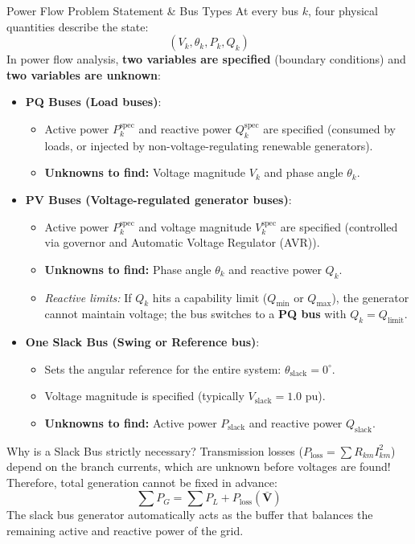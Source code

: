 \begin{frame}[allowframebreaks]{Power Flow Problem Statement \& Bus Types}
    At every bus $k$, four physical quantities describe the state:
    $$(V_k, \theta_k, P_k, Q_k)$$
    In power flow analysis, \textbf{two variables are specified} (boundary conditions) and \textbf{two variables are unknown}:
    
    \begin{itemize}
        \item \textbf{PQ Buses (Load buses)}:
        \begin{itemize}
            \item Active power $P_k^{\text{spec}}$ and reactive power $Q_k^{\text{spec}}$ are specified (consumed by loads, or injected by non-voltage-regulating renewable generators).
            \item \textbf{Unknowns to find:} Voltage magnitude $V_k$ and phase angle $\theta_k$.
        \end{itemize} \newpage
        \item \textbf{PV Buses (Voltage-regulated generator buses)}:
        \begin{itemize}
            \item Active power $P_k^{\text{spec}}$ and voltage magnitude $V_k^{\text{spec}}$ are specified (controlled via governor and Automatic Voltage Regulator (AVR)).
            \item \textbf{Unknowns to find:} Phase angle $\theta_k$ and reactive power $Q_k$.
            \item \textit{Reactive limits:} If $Q_k$ hits a capability limit ($Q_{\min}$ or $Q_{\max}$), the generator cannot maintain voltage; the bus switches to a \textbf{PQ bus} with $Q_k = Q_{\text{limit}}$.
        \end{itemize}
        \item \textbf{One Slack Bus (Swing or Reference bus)}:
        \begin{itemize}
            \item Sets the angular reference for the entire system: $\theta_{\text{slack}} = 0^\circ$.
            \item Voltage magnitude is specified (typically $V_{\text{slack}} = 1.0\text{ pu}$).
            \item \textbf{Unknowns to find:} Active power $P_{\text{slack}}$ and reactive power $Q_{\text{slack}}$.
        \end{itemize}
    \end{itemize}
    
    \begin{alertblock}{Why is a Slack Bus strictly necessary?}
        Transmission losses ($P_{\text{loss}} = \sum R_{km} I_{km}^2$) depend on the branch currents, which are unknown before voltages are found!
        Therefore, total generation cannot be fixed in advance:
        $$\sum P_{G} = \sum P_{L} + P_{\text{loss}}(\mathbf{\bar{V}})$$
        The slack bus generator automatically acts as the buffer that balances the remaining active and reactive power of the grid.
    \end{alertblock}
\end{frame}

